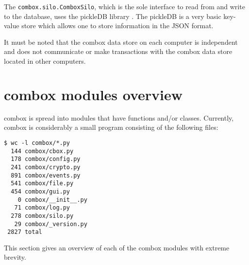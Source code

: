 The \verb+combox.silo.ComboxSilo+, which is the sole interface to read
from and write to the database, uses the pickleDB library
\cite{pylib:pickledb}. The pickleDB is a very basic key-value store
which allows one to store information in the JSON format.

It must be noted that the combox data store on each computer is
independent and does not communicate or make transactions with the
combox data store located in other computers.

\section{combox modules overview}

combox is spread into modules that have functions and/or
classes. Currently, combox is considerably a small program consisting
of the following files:

\begin{verbatim}
$ wc -l combox/*.py
  144 combox/cbox.py
  178 combox/config.py
  241 combox/crypto.py
  891 combox/events.py
  541 combox/file.py
  454 combox/gui.py
    0 combox/__init__.py
   71 combox/log.py
  278 combox/silo.py
   29 combox/_version.py
 2827 total
\end{verbatim}

This section gives an overview of each of the combox modules with
extreme brevity.

